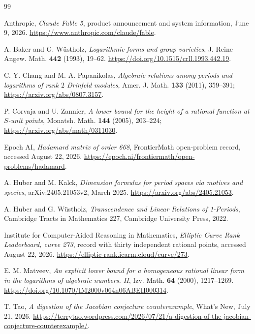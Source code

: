 \documentclass[11pt]{article}
\theoremstyle{definition}
\begin{document}
\begin{thebibliography}{99}

Anthropic,
\emph{Claude Fable 5}, product announcement and system information,
June 9, 2026.
\url{https://www.anthropic.com/claude/fable}.

A. Baker and G. W\"ustholz,
\emph{Logarithmic forms and group varieties},
J. Reine Angew. Math. \textbf{442} (1993), 19--62.
\url{https://doi.org/10.1515/crll.1993.442.19}.

C.-Y. Chang and M. A. Papanikolas,
\emph{Algebraic relations among periods and logarithms of rank $2$ Drinfeld modules},
Amer. J. Math. \textbf{133} (2011), 359--391;
\url{https://arxiv.org/abs/0807.3157}.

P. Corvaja and U. Zannier,
\emph{A lower bound for the height of a rational function at $S$-unit points},
Monatsh. Math. \textbf{144} (2005), 203--224;
\url{https://arxiv.org/abs/math/0311030}.

Epoch AI,
\emph{Hadamard matrix of order 668}, FrontierMath open-problem record,
accessed August 22, 2026.
\url{https://epoch.ai/frontiermath/open-problems/hadamard}.

A. Huber and M. Kalck,
\emph{Dimension formulas for period spaces via motives and species},
arXiv:2405.21053v2, March 2025.
\url{https://arxiv.org/abs/2405.21053}.

A. Huber and G. W\"ustholz,
\emph{Transcendence and Linear Relations of 1-Periods},
Cambridge Tracts in Mathematics 227, Cambridge University Press, 2022.

Institute for Computer-Aided Reasoning in Mathematics,
\emph{Elliptic Curve Rank Leaderboard, curve 273},
record with thirty independent rational points, accessed August 22, 2026.
\url{https://elliptic-rank.icarm.cloud/curve/273}.

E. M. Matveev,
\emph{An explicit lower bound for a homogeneous rational linear form in the logarithms of algebraic numbers. II},
Izv. Math. \textbf{64} (2000), 1217--1269.
\url{https://doi.org/10.1070/IM2000v064n06ABEH000314}.

T. Tao,
\emph{A digestion of the Jacobian conjecture counterexample},
What's New, July 21, 2026.
\url{https://terrytao.wordpress.com/2026/07/21/a-digestion-of-the-jacobian-conjecture-counterexample/}.

\end{thebibliography}
\end{document}
